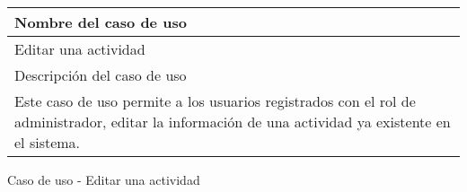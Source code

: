 \begin{identificacionCasoDeUso}
	\begin{tabular} { | p{17cm} |}

		\hline
		Nombre del caso de uso                                                                                                                              \\ \hline
		Editar una actividad                                                                                                                                \\ \hline
		Descripción del caso de uso                                                                                                                         \\ \hline
		Este caso de uso permite a los usuarios registrados con el rol de administrador, editar la información de una actividad ya existente en el sistema. \\ \hline
	\end{tabular}
	\caption{Caso de uso - Editar una actividad}
\end{identificacionCasoDeUso}